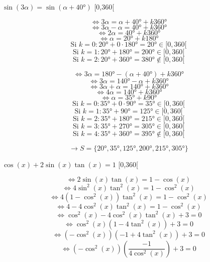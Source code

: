 \documentclass{article}
\begin{document}
 $\sin(3\alpha) = \sin(\alpha+40°)$
[0,360[\text{)}

\[ \Leftrightarrow 3\alpha = \alpha + 40° + k360° \]
\[ \Leftrightarrow 3\alpha - \alpha = 40° + k360° \]
\[ \Leftrightarrow 2\alpha = 40° + k360° \]
\[ \Leftrightarrow \alpha = 20° + k180° \]
\[ \text{Si } k=0 : 20° + 0 \cdot 180° = 20° \in [0,360[ \]
\[ \text{Si } k=1 : 20° + 180° = 200° \in [0,360[ \]
\[ \text{Si } k=2 : 20° + 360° = 380° \notin [0,360[ \]

\[ \Leftrightarrow 3\alpha = 180° - (\alpha + 40°) + k360° \]
\[ \Leftrightarrow 3\alpha = 140° - \alpha + k360° \]
\[ \Leftrightarrow 3\alpha + \alpha = 140° + k360° \]
\[ \Leftrightarrow 4\alpha = 140° + k360° \]
\[ \Leftrightarrow \alpha = 35° + k90° \]
\[ \text{Si } k=0 : 35° + 0 \cdot 90° = 35° \in [0,360[ \]
\[ \text{Si } k=1 : 35° + 90° = 125° \in [0,360[ \]
\[ \text{Si } k=2 : 35° + 180° = 215° \in [0,360[ \]
\[ \text{Si } k=3 : 35° + 270° = 305° \in [0,360[ \]
\[ \text{Si } k=4 : 35° + 360° = 395° \notin [0,360[ \]

\[ \rightarrow S = \{20°, 35°, 125°, 200°, 215°, 305°\} \]


 $\cos(x) + 2\sin(x)\tan(x) = 1$
[0,360[

\[ \Leftrightarrow 2\sin(x)\tan(x) = 1 - \cos(x) \]
\[ \Leftrightarrow 4\sin^2(x)\tan^2(x) = 1 - \cos^2(x) \]
\[ \Leftrightarrow 4(1-\cos^2(x))\tan^2(x) = 1 - \cos^2(x) \]
\[ \Leftrightarrow 4 - 4\cos^2(x)\tan^2(x) = 1 - \cos^2(x) \]
\[ \Leftrightarrow \cos^2(x) - 4\cos^2(x)\tan^2(x) + 3 = 0 \]
\[ \Leftrightarrow \cos^2(x)(1 - 4\tan^2(x)) + 3 = 0 \]
\[ \Leftrightarrow (-\cos^2(x))(-1 + 4\tan^2(x)) + 3 = 0 \]
\[ \Leftrightarrow (-\cos^2(x))\left(\frac{-1}{4\cos^2(x)}\right) + 3 = 0 \]
\end{document}
